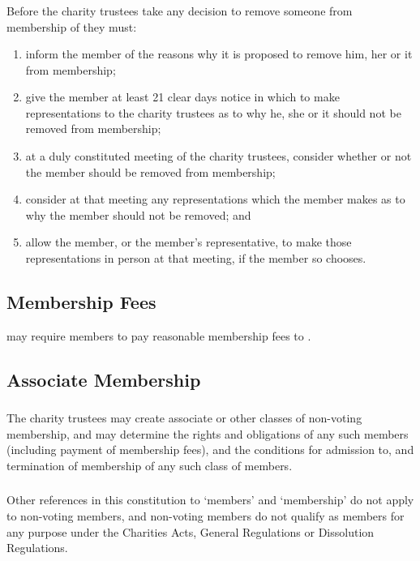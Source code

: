         \subsubsection{}
        Before the charity trustees take any decision to remove someone from membership of \shortname{} they must:
        \begin{enumerate}
            \item inform the member of the reasons why it is proposed to remove him, her or it from membership;
            \item give the member at least 21 clear days notice in which to make representations to the charity trustees as to why he, she or it should not be removed from membership;
            \item at a duly constituted meeting of the charity trustees, consider whether or not the member should be removed from membership;
            \item consider at that meeting any representations which the member makes as to why the member should not be removed; and
            \item allow the member, or the member's representative, to make those representations in person at that meeting, if the member so chooses.
        \end{enumerate}

    \subsection{Membership Fees}\label{sec:fees}
    \shortname{} may require members to pay reasonable membership fees to \shortname{}.

    \subsection{Associate Membership}\label{sec:associate}

        \subsubsection{}
        The charity trustees may create associate or other classes of non-voting membership, and may determine the rights and obligations of any such members (including payment of membership fees), and the conditions for admission to, and termination of membership of any such class of members.

        \subsubsection{}
        Other references in this constitution to `members' and `membership' do not apply to non-voting members, and non-voting members do not qualify as members for any purpose under the Charities Acts, General Regulations or Dissolution Regulations.
